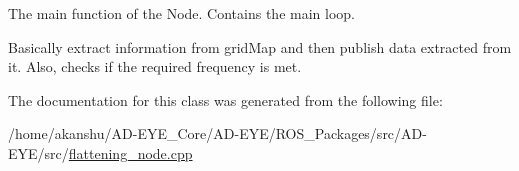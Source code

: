 The main function of the Node. Contains the main loop. 

Basically extract information from grid\+Map and then publish data extracted from it. Also, checks if the required frequency is met. 

The documentation for this class was generated from the following file\+:\begin{DoxyCompactItemize}
\item 
/home/akanshu/\+A\+D-\/\+E\+Y\+E\+\_\+\+Core/\+A\+D-\/\+E\+Y\+E/\+R\+O\+S\+\_\+\+Packages/src/\+A\+D-\/\+E\+Y\+E/src/\hyperlink{flattening__node_8cpp}{flattening\+\_\+node.\+cpp}\end{DoxyCompactItemize}
